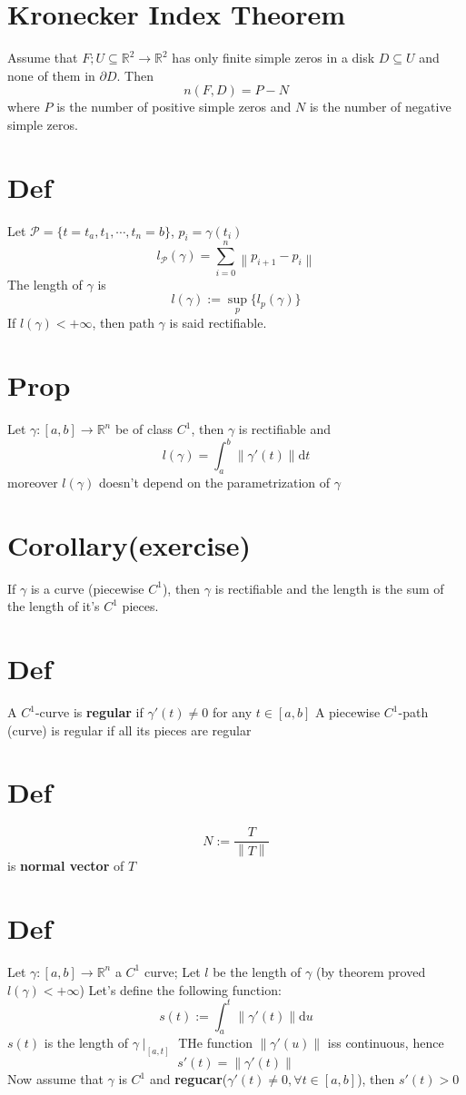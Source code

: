 \documentclass{book}
\newcommand{\norm}[1]{\left\lVert #1 \right\rVert}
\begin{document}
\section{Kronecker Index Theorem}
Assume that $F;U\subseteq \mathbb{R}^2\rightarrow\mathbb{R}^2$ has only finite simple zeros in a disk $D\subseteq U$ and none of them in $\partial D$. Then
$$n(F,D)=P-N$$
where $P$ is the number of positive simple zeros and $N$ is the number of negative simple zeros.
\section{Def}
Let $\mathcal{P}=\{t=t_a,t_1,\cdots,t_n=b\}$, $p_i=\gamma(t_i)$
$$l_{\mathcal{P}}(\gamma)=\sum\limits_{i=0}^n\norm{p_{i+1}-p_i}$$
The length of $\gamma$ is 
$$l(\gamma):=\sup\limits_p\{l_p(\gamma)\}$$
If $l(\gamma)<+\infty$, then path $\gamma$ is said rectifiable.
\section{Prop}
Let $\gamma:[a,b]\rightarrow\mathbb{R}^n$ be of class $C^1$, then $\gamma$ is rectifiable and $$l(\gamma)=\int_a^b\norm{\gamma'(t)}\text{d}t$$
moreover $l(\gamma)$ doesn't depend on the parametrization of $\gamma$
\section{Corollary(exercise)}
If $\gamma$ is a curve (piecewise $C^1$), then $\gamma$ is rectifiable and the length is the sum of the length of it's $C^1$ pieces.
\section{Def}
A $C^1$-curve is \textbf{regular} if $\gamma'(t)\neq0$ for any $t\in [a,b]$ A piecewise $C^1$-path (curve) is regular if all its pieces are regular



\section{Def}
$$N:=\frac{T}{\norm{T}}$$ is \textbf{normal vector} of $T$
\section{Def}
Let $\gamma:[a,b]\rightarrow\mathbb{R}^n$ a $C^1$ curve; Let $l$ be the length of $\gamma$ (by theorem proved $l(\gamma)<+\infty$) Let's define the following function:
$$s(t):=\int_a^t\norm{\gamma'(t)}\text{d}u$$
$s(t)$ is the length of $\gamma\mid_{[a,t]}$
THe function $\norm{\gamma'(u)}$ iss continuous, hence
$$s'(t)=\norm{\gamma'(t)}$$
Now assume that $\gamma$ is $C^1$ and \textbf{regucar}($\gamma'(t)\neq0,\forall t\in [a,b]$), then $s'(t)>0$
\end{document}
